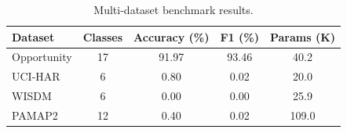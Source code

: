 \begin{table}[htbp]
\centering
\caption{Multi-dataset benchmark results.}
\label{tab:all_datasets}
\begin{tabular}{lcccc}
\toprule
\textbf{Dataset} & \textbf{Classes} & \textbf{Accuracy (\%)} & \textbf{F1 (\%)} & \textbf{Params (K)} \\
\midrule
Opportunity & 17 & 91.97 & 93.46 & 40.2 \\
UCI-HAR & 6 & 0.80 & 0.02 & 20.0 \\
WISDM & 6 & 0.00 & 0.00 & 25.9 \\
PAMAP2 & 12 & 0.40 & 0.02 & 109.0 \\
\bottomrule
\end{tabular}
\end{table}
